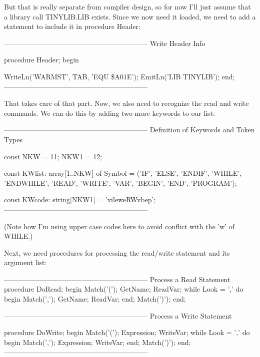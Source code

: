 \documentclass[float=false, crop=false]{standalone}
\begin{document}
But that is really separate from compiler design, so for now I'll just assume
that a library call TINYLIB.LIB exists. Since we now need it loaded, we need to
add a statement to include it in procedure Header:

\begin{code}
{--------------------------------------------------------------}
{ Write Header Info }

procedure Header;
begin

   WriteLn('WARMST', TAB, 'EQU \$A01E');
   EmitLn('LIB TINYLIB');
end;
{--------------------------------------------------------------}
\end{code}

That takes care of that part. Now, we also need to recognize the read and write
commands. We can do this by adding two more keywords to our list:

\begin{code}
{--------------------------------------------------------------}
{ Definition of Keywords and Token Types }

const NKW =   11;
      NKW1 = 12;

const KWlist: array[1..NKW] of Symbol =
              ('IF', 'ELSE', 'ENDIF', 'WHILE', 'ENDWHILE',
               'READ',    'WRITE',    'VAR',    'BEGIN',   'END',
'PROGRAM');

const KWcode: string[NKW1] = 'xileweRWvbep';
{--------------------------------------------------------------}
\end{code}

(Note how I'm using upper case codes here to avoid conflict with the 'w' of
WHILE.)

Next, we need procedures for processing the read/write statement and its
argument list:

\begin{code}
{--------------------------------------------------------------}
{ Process a Read Statement }
procedure DoRead;
begin
   Match('(');
   GetName;
   ReadVar;
   while Look = ',' do begin
      Match(',');
      GetName;
      ReadVar;
   end;
   Match(')');
end;


{--------------------------------------------------------------}
{ Process a Write Statement }

procedure DoWrite;
begin
   Match('(');
   Expression;
   WriteVar;
   while Look = ',' do begin
      Match(',');
      Expression;
      WriteVar;
   end;
   Match(')');
end;
{--------------------------------------------------------------}
\end{code}
\end{document}

